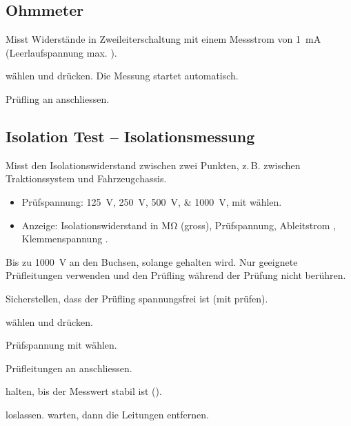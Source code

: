 \subsection{Ohmmeter}
\label{sec:mode_ohm}
Misst Widerstände in Zweileiterschaltung mit einem Messstrom von \qty{1}{\milli\ampere}
(Leerlaufspannung max. ).
\begin{steps}
    \item {} wählen und  drücken. Die Messung startet automatisch.
    \item Prüfling an  anschliessen.
\end{steps}

\subsection{Isolation Test -- Isolationsmessung}
\label{sec:mode_iso}
Misst den Isolationswiderstand zwischen zwei Punkten, z.\,B. zwischen Traktionssystem und
Fahrzeugchassis.
\begin{itemize}
    \item Prüfspannung: \qtylist{125;250;500;1000}{\volt}, mit \enc{} wählen.
    \item Anzeige: Isolationswiderstand in \unit{\mega\ohm} (gross), Prüfspannung,
          Ableitstrom , Klemmenspannung .
\end{itemize}
\begin{danger}
    Bis zu \qty{1000}{\volt} an den Buchsen, solange  gehalten wird. Nur geeignete
    Prüfleitungen verwenden und den Prüfling während der Prüfung nicht berühren.
\end{danger}
\begin{steps}
    \item Sicherstellen, dass der Prüfling spannungsfrei ist (mit  prüfen).
    \item {} wählen und  drücken.
    \item Prüfspannung mit \enc{} wählen.
    \item Prüfleitungen an  anschliessen.
    \item {} halten, bis der Messwert stabil ist ().
    \item {} loslassen.  warten, dann die Leitungen entfernen.
\end{steps}

